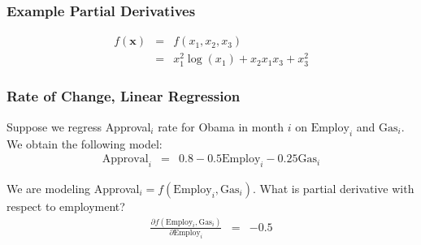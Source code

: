 \documentclass{beamer}
\numberwithin{equation}{section}
\begin{document}
\begin{frame}
\frametitle{Example Partial Derivatives}

\begin{eqnarray}
f(\boldsymbol{x}) & = & f(x_{1}, x_{2}, x_{3}) \nonumber \\
							& = & x_{1}^2 \log(x_{1}) + x_{2}x_{1}x_{3} + x_{3}^2 \nonumber 
\end{eqnarray}

\pause 
{}     








\pause\pause 





\end{frame}




\begin{frame}
\frametitle{Rate of Change, Linear Regression}

Suppose we regress \alert{Approval}$_{i}$ rate for Obama in month $i$ on $\text{Employ}_{i}$ and $\text{Gas}_{i}$.  We obtain the following model:
\begin{eqnarray}
\text{Approval}_{i} & = & 0.8  -0.5 \text{Employ}_{i}  -0.25 \text{Gas}_{i} \nonumber 
\end{eqnarray}

We are modeling Approval$_{i} = f(\text{Employ}_{i}, \text{Gas}_{i} )$.  What is partial derivative with respect to employment?
\begin{eqnarray}
\frac{\partial f(\text{Employ}_{i}, \text{Gas}_{i} ) }{\partial \text{Employ}_{i} } & = & -0.5 \nonumber 
\end{eqnarray}


\end{frame}
\end{document}
